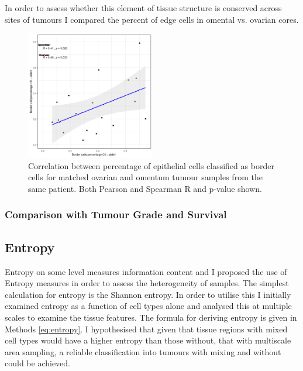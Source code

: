 In order to assess whether this element of tissue structure is conserved across sites of tumours I compared the percent of edge cells in omental vs. ovarian cores. 
\begin{figure}
    \centering
    \includegraphics[width=0.5\textwidth]{Chapter3/Figs/edge_plot_676517_676513.png}
    \caption[Correlation between percentage of epithelial cells classified as border cells for matched Ovarian and Omentum tumour samples]{Correlation between percentage of epithelial cells classified as border cells for matched ovarian and omentum tumour samples from the same patient. Both Pearson and Spearman R and p-value  shown.}
    \label{fig:diff_sites_edge}
\end{figure}

\subsubsection{Comparison with Tumour Grade and Survival}



\subsection{Entropy}
Entropy on some level measures information content and I proposed the use of Entropy measures in order to assess the heterogeneity of samples. The simplest calculation for entropy is the Shannon entropy. In order to utilise this I initially examined entropy as a function of cell types alone and analysed this at multiple scales to examine the tissue features. The formula for deriving entropy is given in Methods \ref{eq:entropy}. I hypothesised that given that tissue regions with mixed cell types would have a higher entropy than those without, that with multiscale area sampling, a reliable classification into tumours with mixing and without could be achieved. 

